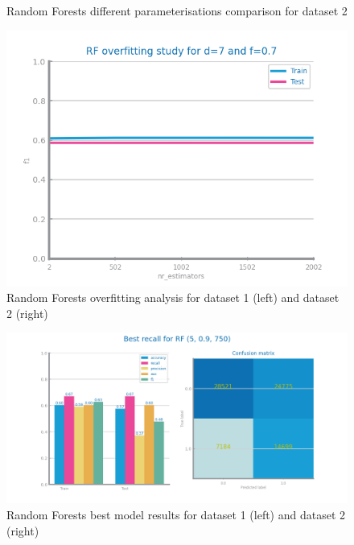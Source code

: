 \documentclass[10pt]{extarticle}
\begin{document}
\begin{figure}[H]
\caption{Random Forests different parameterisations comparison for dataset 2}
\end{figure}

\begin{figure}[H]
\centering\includegraphics[scale=0.95]{images/dataset1/models_evaluation/CovidPos_rf_f1_overfitting.png}
\caption{Random Forests overfitting analysis for dataset 1 (left) and dataset 2 (right)}
\end{figure}

\begin{figure}[H]
\centering\includegraphics[scale=0.95]{images/dataset1/models_evaluation/CovidPos_rf_RF_best_recall_eval.png}
\caption{Random Forests best model results for dataset 1 (left) and dataset 2 (right)}
\end{figure}
\end{document}
